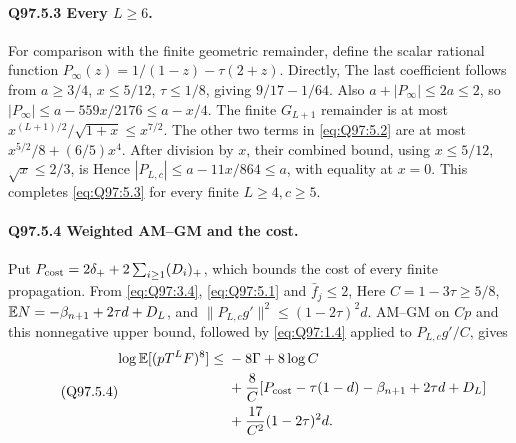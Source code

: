 \paragraph{Q97.5.3 Every \(L\ge\allowbreak 6\).}
For comparison with the finite geometric remainder, define the scalar
rational function \(P_\infty(z)=\allowbreak 1/(1-z)-\tau(2+z)\). Directly,
The last coefficient follows from \(a\ge\allowbreak 3/4\), \(x\le\allowbreak 5/12\),
\(\tau\le\allowbreak 1/8\), giving \(9/17-1/64\).
Also \(a+|P_\infty|\le\allowbreak 2a\le\allowbreak 2\), so
\(|P_\infty|\le\allowbreak  a-559x/2176\le\allowbreak  a-x/4\).
The finite \(G_{L+1}\) remainder is at most
\(x^{(L+1)/2}/\sqrt{1+x}\le\allowbreak  x^{7/2}\).
The other two terms in \eqref{eq:Q97:5.2} are at most
\(x^{5/2}/8+(6/5)x^4\). After division by \(x\), their combined
bound, using \(x\le\allowbreak 5/12\), \(\sqrt x\le\allowbreak 2/3\), is
Hence \(|P_{L,\allowbreak c}|\le\allowbreak  a-11x/864\le\allowbreak  a\), with equality at \(x=\allowbreak 0\).
This completes \eqref{eq:Q97:5.3} for every finite \(L\ge\allowbreak 4,\allowbreak c\ge\allowbreak 5\).

\paragraph{Q97.5.4 Weighted AM--GM and the cost.}
Put \(P_{\rm cost}=\allowbreak 2\delta_++2\sum_{i\ge\allowbreak 1}(D_i)_+\), which bounds
the cost of every finite propagation. From \eqref{eq:Q97:3.4},
\eqref{eq:Q97:5.1} and \(\bar f_j\le\allowbreak 2\),
Here \(C=\allowbreak 1-3\tau\ge\allowbreak 5/8\),
\(\mathbb E N=\allowbreak -\beta_{n+1}+2\tau d+D_L\), and
\(\|P_{L,\allowbreak c}g'\|^2\le\allowbreak (1-2\tau)^2d\).
AM--GM on \(Cp\) and this nonnegative upper bound, followed by
\eqref{eq:Q97:1.4} applied to \(P_{L,\allowbreak c}g'/C\), gives
\begin{equation}\tag{Q97.5.4}\label{eq:Q97:5.4}
\begin{aligned}
\log\mathbb E[(pT^LF)^8]\le{}&-8\Gamma+8\log C\\
&+\frac8C[P_{\rm cost}-\tau(1-d)-\beta_{n+1}+2\tau d+D_L]\\
&+\frac{17}{C^2}(1-2\tau)^2d.
\end{aligned}
\end{equation}

